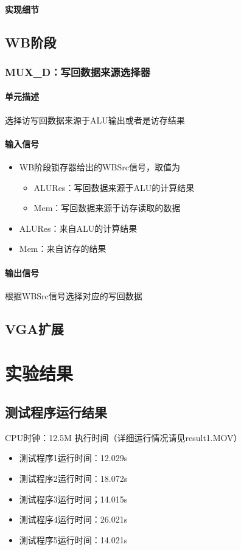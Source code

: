 \documentclass{article}
\begin{document}
\paragraph{实现细节}

\subsection{WB阶段}
		
\subsubsection{MUX\_D：写回数据来源选择器}
		
\paragraph{单元描述}
选择访写回数据来源于ALU输出或者是访存结果
		
\paragraph{输入信号}
\begin{itemize}
\item WB阶段锁存器给出的WBSrc信号，取值为
		\begin{itemize}
			\item ALURes：写回数据来源于ALU的计算结果
			\item Mem：写回数据来源于访存读取的数据
		\end{itemize}
\item ALURes：来自ALU的计算结果
\item Mem：来自访存的结果
\end{itemize}
\paragraph{输出信号}
根据WBSrc信号选择对应的写回数据

		
\subsection{VGA扩展}
		
\section{实验结果}
\subsection{测试程序运行结果} 
CPU时钟：12.5M
执行时间（详细运行情况请见result1.MOV）
\begin{itemize}
    \item 测试程序1运行时间：12.029s
    \item 测试程序2运行时间：18.072s
    \item 测试程序3运行时间；14.015s
    \item 测试程序4运行时间：26.021s
    \item 测试程序5运行时间：14.021s
\end{itemize} 
\end{document}
